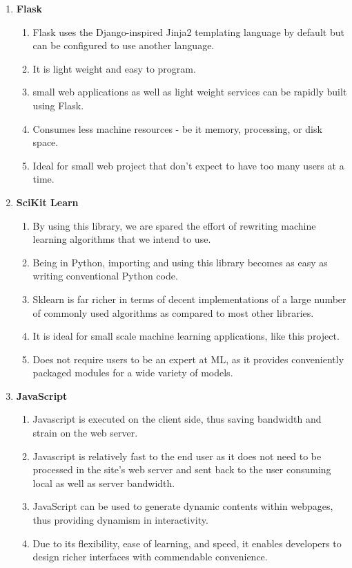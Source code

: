 \begin{enumerate}
\item \textbf{Flask}
	\begin{enumerate}
	\item[] Flask uses the Django-inspired Jinja2 templating language by default but can be configured to use another language.
	\item[] It is light weight and easy to program.
	\item[] small web applications as well as light weight services can be rapidly built using Flask.
	\item[] Consumes less machine resources - be it memory, processing, or disk space.
	\item[] Ideal for small web project that don't expect to have too many users at a time.
	\end{enumerate}

\item \textbf{SciKit Learn}
	\begin{enumerate}
	\item[] By using this library, we are spared the effort of rewriting machine learning algorithms that we intend to use.
	\item[] Being in Python, importing and using this library becomes as easy as writing conventional Python code.
	\item[] Sklearn is far richer in terms of decent implementations of a large number of commonly used algorithms as compared to most other libraries.
	\item[] It is ideal for small scale machine learning applications, like this project.
	\item[] Does not require users to be an expert at ML, as it provides conveniently packaged modules for a wide variety of models.
	\end{enumerate}

\item \textbf{JavaScript}
	\begin{enumerate}
	\item[] Javascript is executed on the client side, thus saving bandwidth and strain on the web server.
	\item[] Javascript is relatively fast to the end user as it does not need to be processed in the site's web server and sent back to the user consuming local as well as server bandwidth.
	\item[] JavaScript can be used to generate dynamic contents within webpages, thus providing dynamism in interactivity.
	\item[] Due to its flexibility, ease of learning, and speed, it enables developers to design richer interfaces with commendable convenience.
	\end{enumerate}


\end{enumerate}
